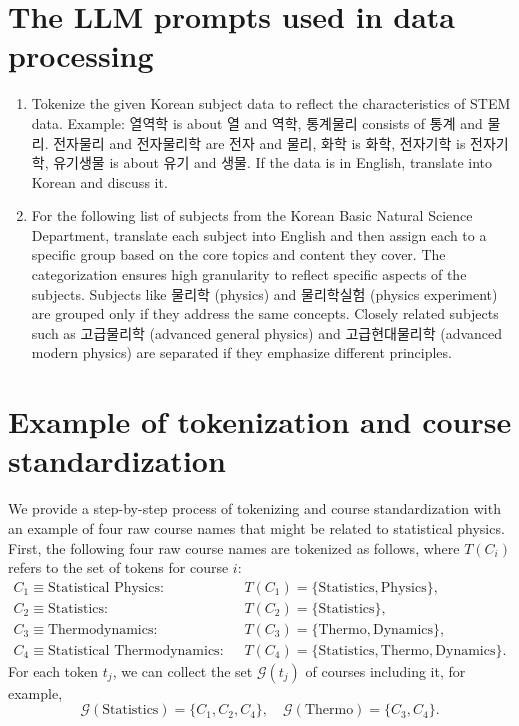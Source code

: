 \documentclass{bmcart}
\begin{document}
\newpage
\begin{appendices}
\section{The LLM prompts used in data processing}
\label{sec:prompts}
\begin{enumerate}
\item Tokenize the given Korean subject data to reflect the characteristics of STEM data. Example: 열역학 is about 열 and 역학, 통계물리 consists of 통계 and 물리. 전자물리 and 전자물리학 are 전자 and 물리, 화학 is 화학, 전자기학 is 전자기학, 유기생물 is about 유기 and 생물. If the data is in English, translate into Korean and discuss it.
\label{prompt1}
\item For the following list of subjects from the Korean Basic Natural Science Department, translate each subject into English and then assign each to a specific group based on the core topics and content they cover. The categorization ensures high granularity to reflect specific aspects of the subjects. Subjects like 물리학 (physics) and 물리학실험 (physics experiment) are grouped only if they address the same concepts. Closely related subjects such as 고급물리학 (advanced general physics) and 고급현대물리학 (advanced modern physics) are separated if they emphasize different principles.
\label{prompt2}
\end{enumerate}

\section{Example of tokenization and course standardization}
\label{sec:example}

We provide a step-by-step process of tokenizing and course standardization with an example of four raw course names that might be related to statistical physics. First, the following four raw course names are tokenized as follows, where $T(C_i)$ refers to the set of tokens for course $i$:
\[
\begin{aligned}
C_1 \equiv \text{Statistical Physics:} &\quad T(C_1) = \{\text{Statistics}, \text{Physics}\}, \\
C_2 \equiv \text{Statistics:} &\quad T(C_2) = \{\text{Statistics}\}, \\
C_3 \equiv \text{Thermodynamics:} &\quad T(C_3) = \{\text{Thermo}, \text{Dynamics}\}, \\
C_4 \equiv \text{Statistical Thermodynamics:} &\quad T(C_4) = \{\text{Statistics}, \text{Thermo}, \text{Dynamics}\}.
\end{aligned}
\]
For each token $t_j$, we can collect the set $\mathcal{G}(t_j)$ of courses including it, for example,
\[
\mathcal{G}(\text{Statistics}) = \{C_1, C_2, C_4\}, \quad \mathcal{G}(\text{Thermo}) = \{C_3, C_4\}.
\]


\end{appendices}
\end{document}
